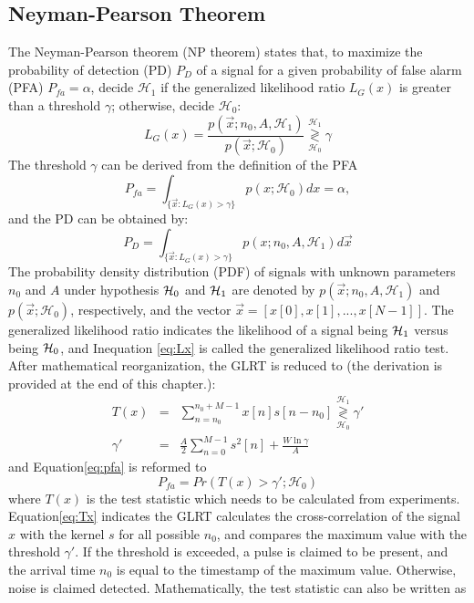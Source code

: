 \subsection{Neyman-Pearson Theorem}
The Neyman-Pearson theorem (NP theorem) states that, to maximize the probability of detection (PD) $P_D$ of a signal for a given probability of false alarm (PFA) $P_{fa}  =\alpha$, decide $\mathcal{H}_1$ if the generalized likelihood ratio $L_G(x)$ is greater than a threshold $\gamma$; otherwise, decide $\mathcal{H}_0$:
\begin{equation} \label{eq:Lx}
L_G(x)=\frac{p(\vec{x};n_0,A,\mathcal{H}_1)}{p(\vec{x};\mathcal{H}_0)}\underset{\mathcal{H}_0}{\overset{\mathcal{H}_1}{\gtrless}}\gamma
\end{equation}
The threshold $\gamma$ can be derived from the definition of the PFA
\begin{equation}\label{eq:pfa}
P_{fa}=\int_{\{\vec{x}:L_G(x)>\gamma\}} p(x;\mathcal{H}_0)dx=\alpha,
\end{equation}
and the PD can be obtained by:
\begin{equation} \label{eq:pd}
P_D=\int_{\{\vec{x}:L_G(x)>\gamma\}}p(x;n_0, A, \mathcal{H}_1)d\vec{x}
\end{equation}
The probability density distribution (PDF)  of signals with unknown parameters $n_0$ and $A$ under hypothesis $\operatorname*{\mathcal{H}_0}$ and $\operatorname*{\mathcal{H}_1}$ are denoted by $p(\vec{x};n_0, A,\mathcal{H}_1)$ and $p(\vec{x};\mathcal{H}_0)$, respectively, and the vector $\vec{x} = [x[0],x[1],...,x[N-1]]$. The generalized likelihood ratio indicates the likelihood of a signal being $\operatorname*{\mathcal{H}_1}$ versus being $\operatorname*{\mathcal{H}_0}$, and Inequation \eqref{eq:Lx} is called the generalized likelihood ratio test. After mathematical reorganization, the GLRT is reduced to (the derivation is provided at the end of this chapter.):
\begin{eqnarray} \label{eq:Tx}
T(x) &=&\sum_{n=n_0}^{n_0+M-1}x[n]s[n-n_0] \underset{\mathcal{H}_0}{\overset{\mathcal{H}_1}{\gtrless}}\gamma'\\
\gamma'&=&\frac{A}{2}\sum_{n=0}^{M-1}s^2[n]+\frac{W\ln\gamma}{A}
\end{eqnarray}
and Equation\eqref{eq:pfa} is reformed to
\begin{equation}\label{eq:pfa2}
P_{fa}=Pr(T(x)>\gamma';\mathcal{H}_0)
\end{equation}
where $T(x)$ is the test statistic which needs to be calculated from experiments. Equation\eqref{eq:Tx} indicates the GLRT calculates the cross-correlation of the signal $x$ with the kernel $s$ for all possible $n_0$, and compares the maximum value with the threshold $\gamma'$. If the threshold is exceeded, a pulse is claimed to be present, and the arrival time $n_0$ is equal to the timestamp of the maximum value. Otherwise, noise is claimed detected. Mathematically, the test statistic can also be written as

